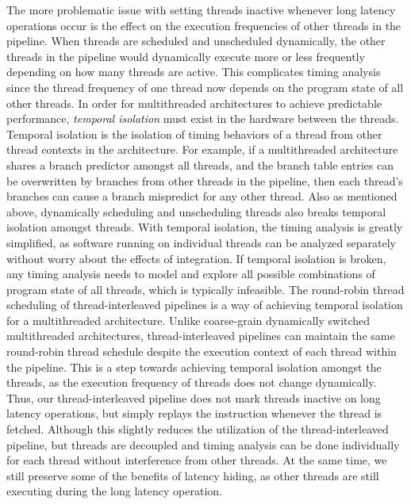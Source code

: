 The more problematic issue with setting threads inactive whenever long latency operations occur is the effect on the execution frequencies of other threads in the pipeline.
When threads are scheduled and unscheduled dynamically, the other threads in the pipeline would dynamically execute more or less frequently depending on how many threads are active.
This complicates timing analysis since the thread frequency of one thread now depends on the program state of all other threads. 
In order for multithreaded architectures to achieve predictable performance, \emph{temporal isolation} must exist in the hardware between the threads.
Temporal isolation is the isolation of timing behaviors of a thread from other thread contexts in the architecture.
For example, if a multithreaded architecture shares a branch predictor amongst all threads, and the branch table entries can be overwritten by branches from other threads in the pipeline, then each thread's branches can cause a branch mispredict for any other thread. 
Also as mentioned above, dynamically scheduling and unscheduling threads also breaks temporal isolation amongst threads.
With temporal isolation, the timing analysis is greatly simplified, as software running on individual threads can be analyzed separately without worry about the effects of integration. 
If temporal isolation is broken, any timing analysis needs to model and explore all possible combinations of program state of all threads, which is typically infeasible.
The round-robin thread scheduling of thread-interleaved pipelines is a way of achieving temporal isolation for a multithreaded architecture.
Unlike coarse-grain dynamically switched multithreaded architectures, thread-interleaved pipelines can maintain the same round-robin thread schedule despite the execution context of each thread within the pipeline. 
This is a step towards achieving temporal isolation amongst the threads, as the execution frequency of threads does not change dynamically.  
Thus, our thread-interleaved pipeline does not mark threads inactive on long latency operations, but simply replays the instruction whenever the thread is fetched.  
Although this slightly reduces the utilization of the thread-interleaved pipeline, but threads are decoupled and timing analysis can be done individually for each thread without interference from other threads.
At the same time, we still preserve some of the benefits of latency hiding, as other threads are still executing during the long latency operation.

